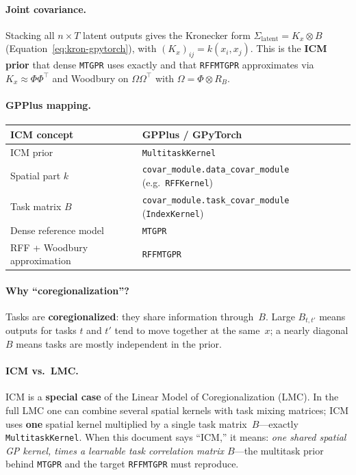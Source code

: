 \documentclass[11pt]{article}
\theoremstyle{plain}
\newcommand{\Sig}{\Sigma}
\newcommand{\Ph}{\Phi}
\newcommand{\Om}{\Omega}
\newcommand{\RB}{R_B}
\begin{document}
\paragraph{Joint covariance.}
Stacking all $n \times T$ latent outputs gives the Kronecker form
$\Sig_{\mathrm{latent}} = K_x \otimes B$ (Equation~\eqref{eq:kron-gpytorch}),
with $(K_x)_{ij} = k(x_i,x_j)$.
This is the \textbf{ICM prior} that dense \texttt{MTGPR} uses exactly and that
\texttt{RFFMTGPR} approximates via $K_x \approx \Ph\Ph^\top$ and Woodbury on
$\Om\Om^\top$ with $\Om = \Ph \otimes \RB$.

\paragraph{GPPlus mapping.}
\begin{center}
\renewcommand{\arraystretch}{1.2}
\begin{tabular}{@{}ll@{}}
\toprule
\textbf{ICM concept} & \textbf{GPPlus / GPyTorch} \\
\midrule
ICM prior & \texttt{MultitaskKernel} \\
Spatial part $k$ & \texttt{covar\_module.data\_covar\_module} (e.g.\ \texttt{RFFKernel}) \\
Task matrix $B$ & \texttt{covar\_module.task\_covar\_module} (\texttt{IndexKernel}) \\
Dense reference model & \texttt{MTGPR} \\
RFF + Woodbury approximation & \texttt{RFFMTGPR} \\
\bottomrule
\end{tabular}
\end{center}

\paragraph{Why ``coregionalization''?}
Tasks are \textbf{coregionalized}: they share information through~$B$.
Large $B_{t,t'}$ means outputs for tasks $t$ and $t'$ tend to move together at the same~$x$;
a nearly diagonal $B$ means tasks are mostly independent in the prior.

\paragraph{ICM vs.\ LMC.}
ICM is a \textbf{special case} of the Linear Model of Coregionalization (LMC).
In the full LMC one can combine several spatial kernels with task mixing matrices;
ICM uses \textbf{one} spatial kernel multiplied by a single task matrix~$B$---exactly
\texttt{MultitaskKernel}.
When this document says ``ICM,'' it means: \emph{one shared spatial GP kernel, times a learnable
task correlation matrix $B$}---the multitask prior behind \texttt{MTGPR} and the target
\texttt{RFFMTGPR} must reproduce.
\end{document}
